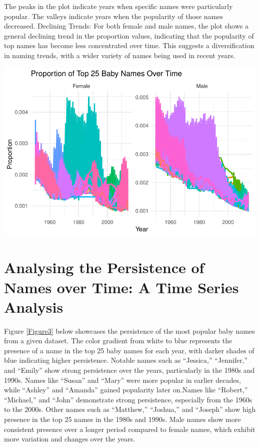 \documentclass[11pt,preprint, authoryear]{elsarticle}
\let\origfigure\figure
\let\endorigfigure\endfigure
\renewenvironment{figure}[1][2] {
    \expandafter\origfigure\expandafter[H]
} {
    \endorigfigure
}
\numberwithin{equation}{section}
\numberwithin{figure}{section}
\numberwithin{table}{section}
\begin{document}
The peaks in the plot indicate years when specific names were
particularly popular. The valleys indicate years when the popularity of
those names decreased. Declining Trends: For both female and male names,
the plot shows a general declining trend in the proportion values,
indicating that the popularity of top names has become less concentrated
over time. This suggests a diversification in naming trends, with a
wider variety of names being used in recent years.

\begin{figure}

{\centering \includegraphics{README_files/figure-latex/unnamed-chunk-2-1} 

}

\caption{The Proportion of the Top 25 Baby Names and their Persistence Over Time\label{Figure2}}\label{fig:unnamed-chunk-2}
\end{figure}

\hypertarget{analysing-the-persistence-of-names-over-time-a-time-series-analysis}{%
\section{Analysing the Persistence of Names over Time: A Time Series
Analysis}\label{analysing-the-persistence-of-names-over-time-a-time-series-analysis}}

Figure \ref{Figure3} below showcases the persistence of the most popular
baby names from a given dataset. The color gradient from white to blue
represents the presence of a name in the top 25 baby names for each
year, with darker shades of blue indicating higher persistence. Notable
names such as ``Jessica,'' ``Jennifer,'' and ``Emily'' show strong
persistence over the years, particularly in the 1980s and 1990s. Names
like ``Susan'' and ``Mary'' were more popular in earlier decades, while
``Ashley'' and ``Amanda'' gained popularity later on.Names like
``Robert,'' ``Michael,'' and ``John'' demonstrate strong persistence,
especially from the 1960s to the 2000s. Other names such as ``Matthew,''
``Joshua,'' and ``Joseph'' show high presence in the top 25 names in the
1980s and 1990s. Male names show more consistent presence over a longer
period compared to female names, which exhibit more variation and
changes over the years.
\end{document}
